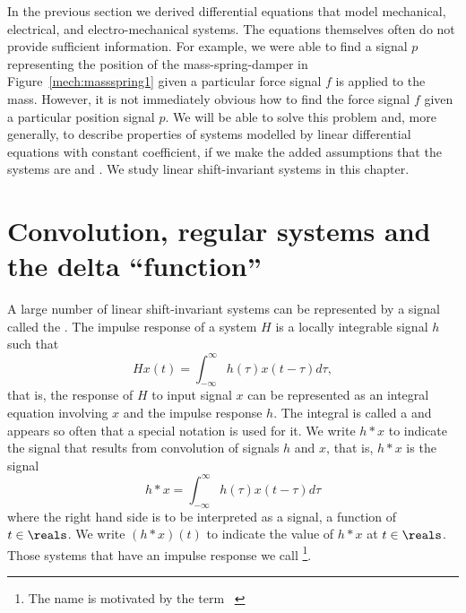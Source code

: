 
In the previous section we derived differential equations that model mechanical, electrical, and electro-mechanical systems.  The equations themselves often do not provide sufficient information.  For example, we were able to find a signal $p$ representing the position of the mass-spring-damper in Figure~\ref{mech:massspring1} given a particular force signal $f$ is applied to the mass.  However, it is not immediately obvious how to find the force signal $f$ given a particular position signal $p$.  We will be able to solve this problem and, more generally, to describe properties of systems modelled by linear differential equations with constant coefficient, if we make the added assumptions that the systems are  and .  We study linear shift-invariant systems in this chapter.  %

\section{Convolution, regular systems and the delta ``function''} \label{sec:conv-regul-syst}

A large number of linear shift-invariant systems can be represented by a signal called the .  The impulse response of a system $H$ is a locally integrable signal $h$ such that
\[
Hx(t) = \int_{-\infty}^{\infty} h(\tau) x(t - \tau) d\tau,
\]
that is, the response of $H$ to input signal $x$ can be represented as an integral equation involving $x$ and the impulse response $h$.  The integral is called a  and appears so often that a special notation is used for it.  We write $h * x$ to  indicate the signal that results from convolution of signals $h$ and $x$, that is, $h * x$ is the signal
\[
h * x = \int_{-\infty}^{\infty} h(\tau) x(t - \tau) d\tau
\]
where the right hand side is to be interpreted as a signal, a function of $t \in \reals$.  We write $(h*x)(t)$ to indicate the value of $h*x$ at $t \in \reals$.  
Those systems that have an impulse response we call \footnote{The name  is motivated by the term ~\citep{Zemanian_dist_theory_1965}}.  

